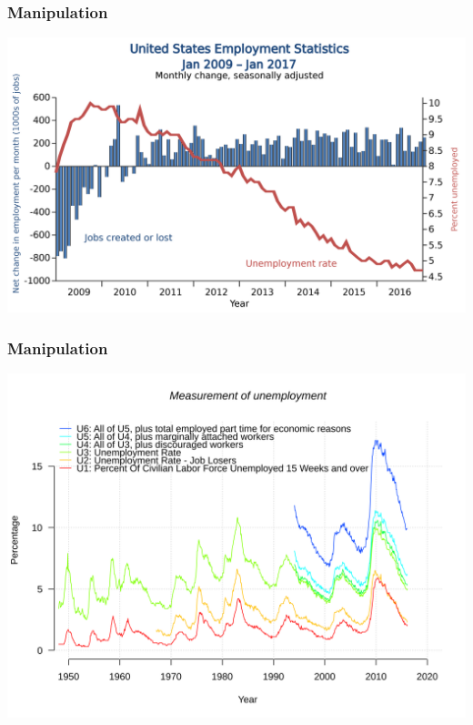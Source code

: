 \documentclass[aspectratio=169]{beamer}
\theoremstyle{principle}
\begin{document}
\begin{frame}
\frametitle{Manipulation}
\begin{center}
\includegraphics[scale=0.12]{unemployment.png}
\end{center}

\end{frame}

\begin{frame}
\frametitle{Manipulation}
\begin{center}
\includegraphics[scale=0.15]{unemployment_2.png}
\end{center}

\end{frame}
\end{document}
